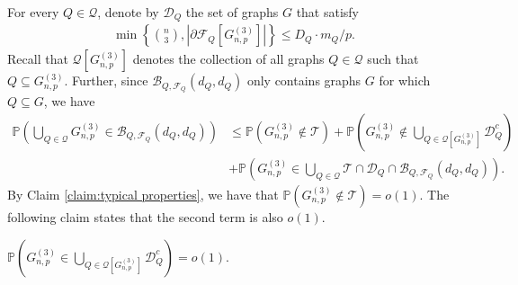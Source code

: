 \documentclass[11pt,a4paper,oneside,reqno]{amsart}
\newcommand{\Gnp}{G_{n, p}^{(3)}}
\newcommand{\cB}{\mathcal{B}}
\newcommand{\cD}{\mathcal{D}}
\newcommand{\cF}{\mathcal{F}}
\newcommand{\cQ}{\mathcal{Q}}
\newcommand{\cT}{\mathcal{T}}
\renewcommand{\Pr}{\mathbb{P}}
\newcommand{\1}{\mathbbm{1}} %
\renewcommand{\le}{\leqslant}
\begin{document}
 For every $Q \in \cQ$, denote by $\cD_Q$ the set of graphs $G$ that satisfy 
\begin{align}\label{align:D_Q inequality}
    \min\left\{\binom{n}{3}, \left|\partial\cF_Q\left[\Gnp\right]\right|\right\} \le D_Q \cdot m_Q/p.
\end{align}
Recall that $\cQ\left[\Gnp\right]$ denotes the collection of all graphs $Q \in \cQ$ such that $Q \subseteq \Gnp$. Further, since $\cB_{Q, \cF_Q}(d_Q, d_Q)$ only contains graphs $G$ for which $Q \subseteq G$, we have
\begin{align*}
    \Pr\left(\bigcup_{Q \in \cQ} \Gnp \in \cB_{Q, \cF_Q}(d_Q, d_Q)\right) &\le \Pr\left(\Gnp \notin \cT\right) + \Pr\left(\Gnp \notin \bigcup_{Q \in \cQ\left[\Gnp\right]} \cD_Q^c \right) \\&+ \Pr\left(\Gnp \in \bigcup_{Q \in \cQ} \cT \cap \cD_Q \cap \cB_{Q, \cF_Q}(d_Q, d_Q)\right).
\end{align*}
By Claim \ref{claim:typical properties}, we have that $\Pr\left(\Gnp \notin \cT\right) = o(1)$. The following claim states that the second term is also $o(1)$.
\begin{claim}
    $\Pr\left(\Gnp \in \bigcup_{Q \in \cQ\left[\Gnp\right]} \cD_Q^c \right) = o(1).$
\end{claim}
\end{document}

